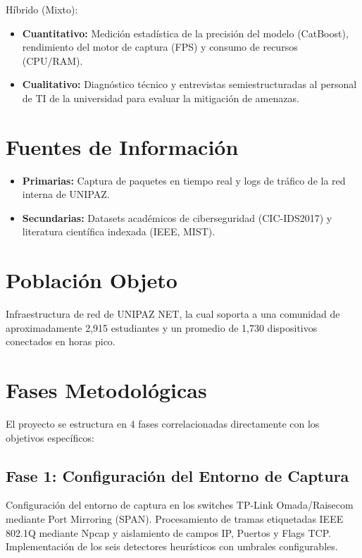 \documentclass[12pt,letterpaper]{report}
\begin{document}
Híbrido (Mixto):
\begin{itemize}
  \item \textbf{Cuantitativo:} Medición estadística de la precisión del modelo (CatBoost), rendimiento del motor de captura (FPS) y consumo de recursos (CPU/RAM).
  \item \textbf{Cualitativo:} Diagnóstico técnico y entrevistas semiestructuradas al personal de TI de la universidad para evaluar la mitigación de amenazas.
\end{itemize}

\section{Fuentes de Información}

\begin{itemize}
  \item \textbf{Primarias:} Captura de paquetes en tiempo real y logs de tráfico de la red interna de UNIPAZ.
  \item \textbf{Secundarias:} Datasets académicos de ciberseguridad (CIC-IDS2017) y literatura científica indexada (IEEE, MIST).
\end{itemize}

\section{Población Objeto}

Infraestructura de red de UNIPAZ NET, la cual soporta a una comunidad de aproximadamente 2,915 estudiantes y un promedio de 1,730 dispositivos conectados en horas pico.

\section{Fases Metodológicas}

El proyecto se estructura en 4 fases correlacionadas directamente con los objetivos específicos:

\subsection{Fase 1: Configuración del Entorno de Captura}

Configuración del entorno de captura en los switches TP-Link Omada/Raisecom mediante Port Mirroring (SPAN). Procesamiento de tramas etiquetadas IEEE 802.1Q mediante Npcap y aislamiento de campos IP, Puertos y Flags TCP. Implementación de los seis detectores heurísticos con umbrales configurables.
\end{document}
